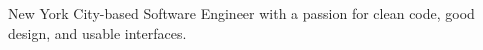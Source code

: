 

\begin{cvparagraph}

New York City-based Software Engineer with a passion for clean code, good design, and usable interfaces.
\end{cvparagraph}
